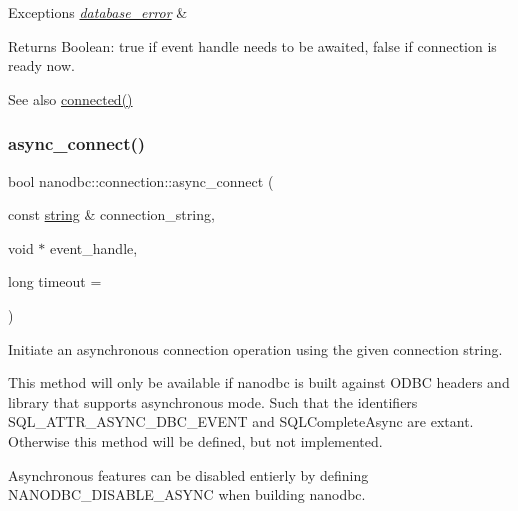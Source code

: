 \begin{DoxyExceptions}{Exceptions}
{\em \mbox{\hyperlink{classnanodbc_1_1database__error}{database\+\_\+error}}} & \\
\hline
\end{DoxyExceptions}
\begin{DoxyReturn}{Returns}
Boolean\+: true if event handle needs to be awaited, false if connection is ready now. 
\end{DoxyReturn}
\begin{DoxySeeAlso}{See also}
\mbox{\hyperlink{classnanodbc_1_1connection_a703da57a7ce3c572f472132ba49a1114}{connected()}} 
\end{DoxySeeAlso}
\mbox{\label{classnanodbc_1_1connection_ab8c6fddf14ec8e6ff136ec0e9dc0aa79}} 
\subsubsection{\texorpdfstring{async\_connect()}{async\_connect()}\hspace{0.1cm}{\footnotesize\ttfamily [2/2]}}
{\footnotesize\ttfamily bool nanodbc\+::connection\+::async\+\_\+connect (\begin{DoxyParamCaption}\item[{const \mbox{\hyperlink{namespacenanodbc_abfc0ece56278e590911ec8352774c212}{string}} \&}]{connection\+\_\+string,  }\item[{void $\ast$}]{event\+\_\+handle,  }\item[{long}]{timeout = {} }\end{DoxyParamCaption})}



Initiate an asynchronous connection operation using the given connection string. 

This method will only be available if nanodbc is built against O\+D\+BC headers and library that supports asynchronous mode. Such that the identifiers {\ttfamily S\+Q\+L\+\_\+\+A\+T\+T\+R\+\_\+\+A\+S\+Y\+N\+C\+\_\+\+D\+B\+C\+\_\+\+E\+V\+E\+NT} and {\ttfamily S\+Q\+L\+Complete\+Async} are extant. Otherwise this method will be defined, but not implemented.

Asynchronous features can be disabled entierly by defining {\ttfamily N\+A\+N\+O\+D\+B\+C\+\_\+\+D\+I\+S\+A\+B\+L\+E\+\_\+\+A\+S\+Y\+NC} when building nanodbc.


